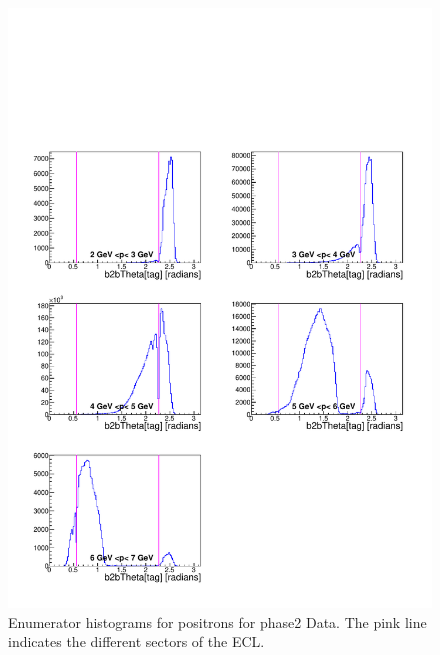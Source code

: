 \documentclass[a4paper,11pt,twosided,final,german,openbib,pdftex,listof=totoc,bibliography=totoc]{scrbook}
\begin{document}
\begin{appendix}
\begin{figure}[!htbp]
	\centering
	\includegraphics[width=\textwidth]{Plots/master/xPMThetaepE_Data}
	\caption[Momentum $\theta$ Positron Enumerator Histogram Phase2 Data]{Enumerator histograms for positrons for phase2 Data. The pink line indicates the different sectors of the ECL.}
	\label{plt:PMThetaepE_Data}
\end{figure}



\end{appendix}
\end{document}

